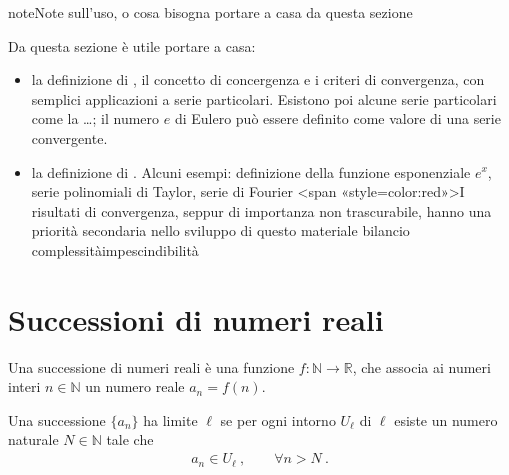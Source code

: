\documentclass[letterpaper,10pt,italian]{jupyterBook}
\begin{document}
\begin{sphinxadmonition}{note}{Note sull’uso, o cosa bisogna portare a casa da questa sezione}

\sphinxAtStartPar
Da questa sezione è utile portare a casa:
\begin{itemize}
\item {} 
\sphinxAtStartPar
la definizione di , il concetto di concergenza \sphinxhyphen{} e i criteri di convergenza, con semplici applicazioni a serie particolari. Esistono poi alcune serie particolari \sphinxhyphen{} come la  \sphinxhyphen{} …; il numero \(e\) di Eulero può essere definito come valore di una serie convergente.

\item {} 
\sphinxAtStartPar
la definizione di . Alcuni esempi: definizione della funzione esponenziale \(e^x\), serie polinomiali di Taylor, serie di Fourier <span «style=color:red»>I risultati di convergenza, seppur di importanza non trascurabile, hanno una priorità secondaria nello sviluppo di questo materiale \sphinxhyphen{} bilancio complessità\sphinxhyphen{}impescindibilità

\end{itemize}


\end{sphinxadmonition}


\section{Successioni di numeri reali}
\label{\detokenize{ch/series:successioni-di-numeri-reali}}\label{\detokenize{ch/series:math-hs-series-real-sequences}}
\sphinxAtStartPar
{} Una successione di numeri reali è una funzione \(f: \mathbb{N} \rightarrow \mathbb{R}\), che associa ai numeri interi \(n \in \mathbb{N}\) un numero reale \(a_n = f(n)\).

\sphinxAtStartPar
{} Una successione \(\{ a_n \}\) ha limite \(\ell\) se per ogni intorno \(U_{\ell}\) di \(\ell\) esiste un numero naturale \(N \in \mathbb{N}\) tale che
\begin{equation*}
\begin{split}a_n \in U_{\ell} \ , \qquad \forall n > N \ .\end{split}
\end{equation*}
\sphinxAtStartPar
{} 
\end{document}
